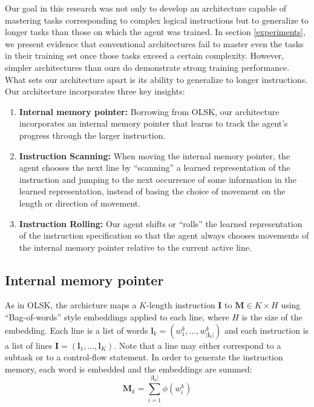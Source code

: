 \documentclass{article}
\begin{document}
\label{approach}
Our goal in this research was not only to develop an architecture capable of
mastering tasks corresponding to complex logical instructions but to generalize
to longer tasks than those on which the agent was trained.
In section \ref{experiments}, we present evidence that conventional architectures
fail to master even the tasks in their training set once those tasks exceed a
certain complexity.
However, simpler architectures than ours do demonstrate strong training
performance.  What sets our architecture apart is
its ability to generalize to longer instructions. Our architecture incorporates three
key insights:

\begin{enumerate}
  \item \textbf{Internal memory pointer:} Borrowing from OLSK, our architecture incorporates an
    internal memory pointer that learns to track the agent's progress through
    the larger instruction.
  \item \textbf{Instruction Scanning:} When moving the internal memory pointer, the agent
    chooses the next line by ``scanning'' a learned representation of the  instruction and
    jumping to the next occurrence of some information in the learned
    representation, instead of basing the choice of movement on
    the length or direction of movement.
  \item \textbf{Instruction Rolling:} Our agent shifts or ``rolls'' the learned representation of the instruction
    specification so that the agent always chooses movements of the internal memory pointer
    relative to the current active line.
\end{enumerate}

\subsection{Internal memory pointer}
\label{internal-memory-pointer}
As in OLSK, the archicture maps a $K$-length instruction
$\mathbf{I}$ to
$\mathbf{M} \in K\times H$ using ``Bag-of-words'' style
embeddings applied to each line, where $H$ is the size of the embedding.  Each line is
a list of words $\mathbf{l}_k = \left(w^k_1,\dots,w^k_{|\mathbf{l}_k|}\right)$ and each instruction is
a list of lines $\mathbf{I} = \left(\mathbf{l}_1,\dots,\mathbf{l}_{K}\right)$. Note that a
line may either correspond to a subtask or to a control-flow statement.
In order to generate the instruction memory, each word is embedded and the
embeddings are summed:
\begin{equation}
  \mathbf{M}_k = \sum_{i=1}^{|\mathbf{l}_k|} \phi\left(w^k_i\right)
\end{equation}
\end{document}
